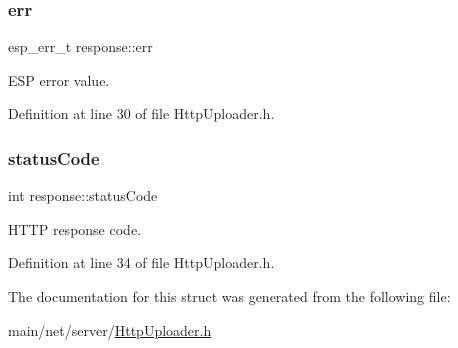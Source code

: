 \subsubsection{\texorpdfstring{err}{err}}
{\footnotesize\ttfamily esp\+\_\+err\+\_\+t response\+::err}

E\+SP error value. 

Definition at line 30 of file Http\+Uploader.\+h.

\mbox{\label{structresponse_afe8bcb416d3c9071b2341046fa9ccfc4}} 
\subsubsection{\texorpdfstring{statusCode}{statusCode}}
{\footnotesize\ttfamily int response\+::status\+Code}

H\+T\+TP response code. 

Definition at line 34 of file Http\+Uploader.\+h.



The documentation for this struct was generated from the following file\+:\begin{DoxyCompactItemize}
\item 
main/net/server/\mbox{\hyperlink{HttpUploader_8h}{Http\+Uploader.\+h}}\end{DoxyCompactItemize}
